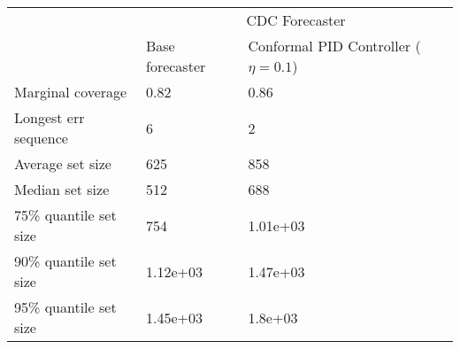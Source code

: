\begin{tabular}{lll}
\toprule
& \multicolumn{2}{c}{CDC Forecaster} \\
& Base forecaster & Conformal PID Controller ($\eta=0.1$) \\
\midrule
Marginal coverage & 0.82 & 0.86 \\
Longest err sequence & 6 & 2 \\
Average set size & 625 & 858 \\
Median set size & 512 & 688 \\
75\% quantile set size & 754 & 1.01e+03 \\
90\% quantile set size & 1.12e+03 & 1.47e+03 \\
95\% quantile set size & 1.45e+03 & 1.8e+03 \\
\bottomrule
\end{tabular}
